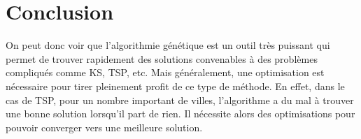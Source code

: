 \documentclass{article}
\begin{document}
\section{Conclusion}
On peut donc voir que l'algorithmie génétique est un outil très puissant qui permet de trouver rapidement des solutions convenables à des problèmes compliqués comme KS, TSP, etc. Mais généralement, une optimisation est nécessaire pour tirer pleinement profit de ce type de méthode. En effet, dans le cas de TSP, pour un nombre important de villes, l'algorithme a du mal à trouver une bonne solution lorsqu'il part de rien. Il nécessite alors des optimisations pour pouvoir converger vers une meilleure solution. 
\end{document}

